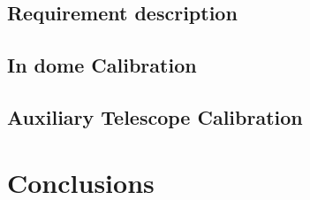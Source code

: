\subsection{Requirement description}
\subsection{In dome Calibration}
\subsection{Auxiliary Telescope Calibration}


\section{Conclusions} 

